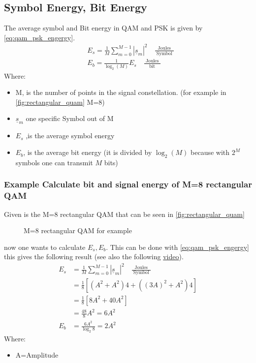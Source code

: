 \subsection{Symbol Energy, Bit Energy}
The average symbol and Bit energy in QAM and PSK is given by \autoref{eq:qam_psk_engergy}.
\begin{equation} \label{eq:qam_psk_engergy}
\begin{aligned}
& E_s=\frac{1}{M} \sum_{m=0}^{M-1}\left|\underline{s}_m\right|^2 \quad \frac{\text { Joules }}{\text { Symbol }} \\
& E_b=\frac{1}{\log_2(M)} E_s \quad \frac{\text { Joules }}{\text { bit }}
\end{aligned}
\end{equation}
Where:
\begin{itemize}
    \item M, is the number of points in the signal constellation. (for example in \autoref{fig:rectangular_quam} M=8)
    \item $\underline{s}_m$ one specific Symbol out of M
    \item $E_s$ ,is the average symbol energy
    \item $E_b$, is the average bit energy (it is divided by $\log_2(M)$ because with $2^M$ symbols one can transmit $M$ bits)
\end{itemize}
\FloatBarrier 
\subsubsection{Example Calculate bit and signal energy of M=8 rectangular QAM}
Given is the M=8 rectangular QAM that can be seen in \autoref{fig:rectangular_quam}
\begin{figure}[ht!]
  \centering
  \caption{M=8 rectangular QAM for example}
  \label{fig:rectangular_quam}
\end{figure}
now one wants to calculate $E_s,E_b$. This can be done with \autoref{eq:qam_psk_engergy} this gives the following result (see also the following \href{https://youtu.be/Z3wHXSCrlSM}{video}).
$$
\begin{aligned}
E_s &=\frac{1}{M} \sum_{m=0}^{M-1}\left|\underline{s}_m\right|^2 \quad \frac{\text { Joules }}{\text { Symbol }}\\
& =\frac{1}{8}\left[\left(A^2+A^2\right) 4+\left((3 A)^2+A^2\right) 4\right] \\
& =\frac{1}{8}\left[8 A^2+40 A^2\right] \\
& =\frac{48}{8} A^2=6 A^2 \\
E_b & =\frac{6 A^2}{\log _2 8}=2 A^2
\end{aligned}
$$
Where:
\begin{itemize}
    \item A=Amplitude
\end{itemize}
\FloatBarrier 
